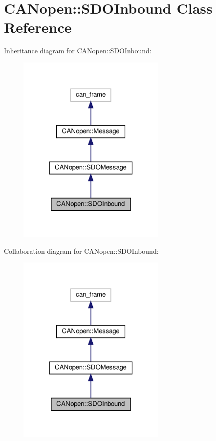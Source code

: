 \hypertarget{class_c_a_nopen_1_1_s_d_o_inbound}{}\section{C\+A\+Nopen\+:\+:S\+D\+O\+Inbound Class Reference}
\label{class_c_a_nopen_1_1_s_d_o_inbound}


Inheritance diagram for C\+A\+Nopen\+:\+:S\+D\+O\+Inbound\+:\nopagebreak
\begin{figure}[H]
\begin{center}
\leavevmode
\includegraphics[width=207pt]{class_c_a_nopen_1_1_s_d_o_inbound__inherit__graph}
\end{center}
\end{figure}


Collaboration diagram for C\+A\+Nopen\+:\+:S\+D\+O\+Inbound\+:\nopagebreak
\begin{figure}[H]
\begin{center}
\leavevmode
\includegraphics[width=207pt]{class_c_a_nopen_1_1_s_d_o_inbound__coll__graph}
\end{center}
\end{figure}
